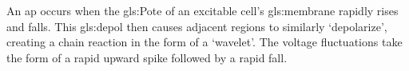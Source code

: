 \documentclass[class={myRUCProject}, crop=false]{standalone}
\begin{document}
An \gls{ap} occurs when the \gls{gls:Pote} of an excitable cell's \gls{gls:membrane} rapidly rises and falls. This \gls{gls:depol} then causes adjacent regions to similarly `depolarize', creating a chain reaction in the form of a `wavelet'.
The voltage fluctuations take the form of a rapid upward spike followed by a rapid fall.

\end{document}
